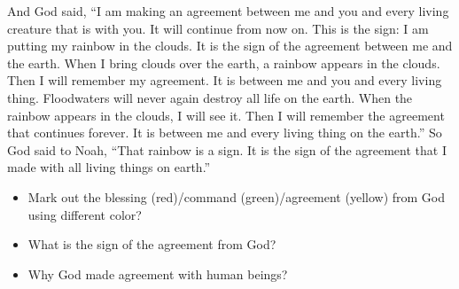 And God said, “I am making an agreement between me and you and every living creature that is with you. It will continue from now on. This is the sign: I am putting my rainbow in the clouds. It is the sign of the agreement between me and the earth. When I bring clouds over the earth, a rainbow appears in the clouds. Then I will remember my agreement. It is between me and you and every living thing. Floodwaters will never again destroy all life on the earth. When the rainbow appears in the clouds, I will see it. Then I will remember the agreement that continues forever. It is between me and every living thing on the earth.” So God said to Noah, “That rainbow is a sign. It is the sign of the agreement that I made with all living things on earth.”

\begin{itemize}
\item Mark out the blessing (red)/command (green)/agreement (yellow) from God using different color?
\item What is the sign of the agreement from God?
\item Why God made agreement with human beings?
\end{itemize}



